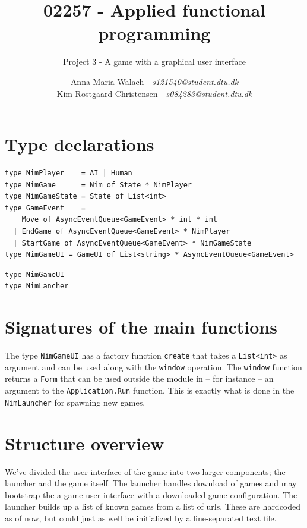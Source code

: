 \documentclass[10pt]{scrartcl}
\title{02257 - Applied functional programming}
\subtitle{Project 3 - A game with a graphical user interface}
\author{Anna Maria Walach - \textit {s121540@student.dtu.dk} \\ Kim Rostgaard Christensen - \textit {s084283@student.dtu.dk}}
\begin{document}
\maketitle
\section{Type declarations}
\begin{lstlisting}
type NimPlayer    = AI | Human
type NimGame      = Nim of State * NimPlayer
type NimGameState = State of List<int>
type GameEvent    =  
    Move of AsyncEventQueue<GameEvent> * int * int 
  | EndGame of AsyncEventQueue<GameEvent> * NimPlayer 
  | StartGame of AsyncEventQueue<GameEvent> * NimGameState
type NimGameUI = GameUI of List<string> * AsyncEventQueue<GameEvent>

\end{lstlisting}

\begin{lstlisting}
type NimGameUI
type NimLancher
\end{lstlisting}

\section{Signatures of the main functions}
The type \texttt{NimGameUI} has a factory function \texttt{create} that takes a \texttt{List<int>} as argument and can be used along with the \texttt{window} operation. The \texttt{window} function returns a \texttt{Form} that can be used outside the module in -- for instance -- an argument to the \texttt{Application.Run} function. This is exactly what is done in the \texttt{NimLauncher} for spawning new games.

\section{Structure overview}
We've divided the user interface of the game into two larger components; the launcher and the game itself. The launcher handles download of games and may bootstrap the a game user interface with a downloaded game configuration. The launcher builds up a list of known games from a list of urls. These are hardcoded as of now, but could just as well be initialized by a line-separated text file.
\end{document}
